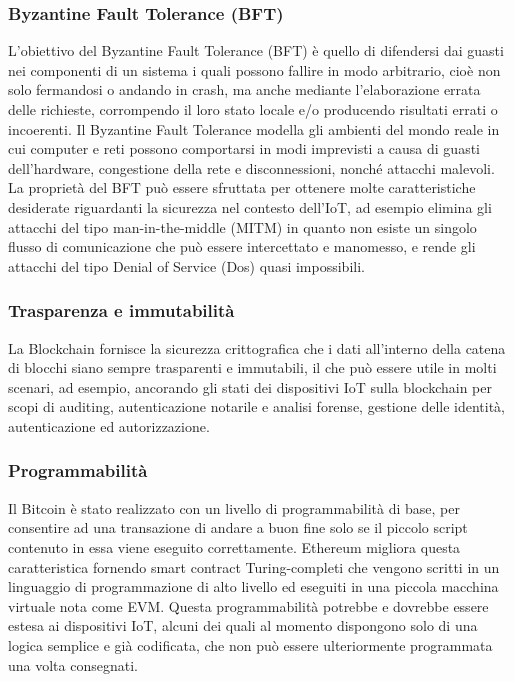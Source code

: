 \subsubsection{Byzantine Fault Tolerance (BFT)}
L'obiettivo del Byzantine Fault Tolerance (BFT) è quello di difendersi dai guasti nei componenti
di un sistema i quali possono fallire in modo arbitrario, cioè non solo fermandosi o andando in crash, ma anche mediante l'elaborazione errata delle richieste, corrompendo il loro stato locale e/o producendo risultati errati o incoerenti. Il Byzantine Fault Tolerance modella gli ambienti del mondo reale in cui computer e reti possono comportarsi in modi imprevisti a causa di guasti dell'hardware, congestione della rete e disconnessioni, nonché attacchi malevoli. La proprietà del BFT può essere sfruttata per ottenere molte caratteristiche desiderate riguardanti la sicurezza nel contesto dell'IoT, ad esempio elimina gli attacchi del tipo man-in-the-middle (MITM) in quanto non esiste un singolo flusso di comunicazione che può essere intercettato e manomesso, e rende gli attacchi del tipo Denial of Service (Dos) quasi impossibili.

\subsubsection{Trasparenza e immutabilità}
La Blockchain fornisce la sicurezza crittografica che i dati all'interno della catena di blocchi siano sempre trasparenti e immutabili, il che può essere utile in molti scenari, ad esempio, ancorando gli stati dei dispositivi IoT sulla blockchain per scopi di auditing, autenticazione notarile e analisi forense, gestione delle identità, autenticazione ed autorizzazione.

\subsubsection{Programmabilità}
Il Bitcoin è stato realizzato con un livello di programmabilità di base, per consentire ad una transazione di andare a buon fine solo se il piccolo script contenuto in essa viene eseguito correttamente. Ethereum migliora questa caratteristica
fornendo smart contract Turing-completi che vengono scritti in un linguaggio di programmazione di alto livello ed eseguiti in una piccola macchina virtuale nota come EVM. Questa programmabilità potrebbe e dovrebbe essere estesa ai dispositivi IoT, alcuni dei quali al momento dispongono solo di una logica semplice e già codificata, che non può essere ulteriormente programmata una volta consegnati.

